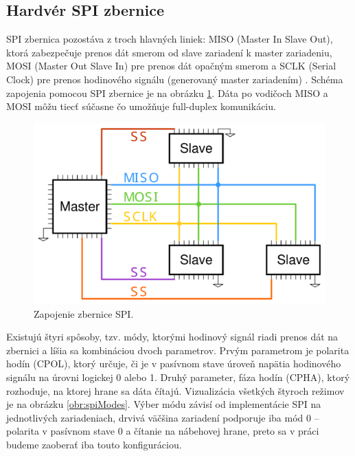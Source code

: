 \subsection{Hardvér SPI zbernice}
SPI zbernica pozostáva z troch hlavných liniek: MISO (Master In Slave Out), ktorá zabezpečuje prenos dát smerom od slave zariadení k master zariadeniu, MOSI (Master Out Slave In) pre prenos dát opačným smerom a SCLK (Serial Clock) pre prenos hodinového signálu (generovaný master zariadením) \cite{spiBus}. Schéma zapojenia pomocou SPI zbernice je na obrázku \ref{obr:spiWiring}. Dáta po vodičoch MISO a MOSI môžu tiecť súčasne čo umožňuje full-duplex komunikáciu.

\begin{figure}
    \centerline{\includegraphics[width=1\textwidth]{images/busses/spiWiring.pdf}}
    \caption[Zapojenie zbernice SPI]{Zapojenie zbernice SPI.}
    \label{obr:spiWiring}
\end{figure}

Existujú štyri spôsoby, tzv. módy, ktorými hodinový signál riadi prenos dát na zbernici a líšia sa kombináciou dvoch parametrov. Prvým parametrom je polarita hodín (CPOL), ktorý určuje, či je v pasívnom stave úroveň napätia hodinového signálu na úrovni logickej 0 alebo 1. Druhý parameter, fáza hodín (CPHA), ktorý rozhoduje, na ktorej hrane sa dáta čítajú. Vizualizácia všetkých štyroch režimov je na obrázku \ref{obr:spiModes}. Výber módu závisí od implementácie SPI na jednotlivých zariadeniach, drvivá väčšina zariadení podporuje iba mód 0 -- polarita v pasívnom stave 0 a čítanie na nábehovej hrane, preto sa v práci budeme zaoberať iba touto konfiguráciou.

